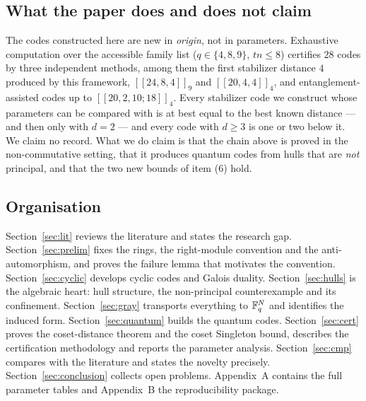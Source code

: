 \subsection{What the paper does and does not claim}

The codes constructed here are new in \emph{origin}, not in parameters.
Exhaustive computation over the accessible family list ($q\in\{4,8,9\}$,
$tn\le8$) certifies $28$ codes by three independent methods, among them the
first stabilizer distance $4$ produced by this framework, $[[24,8,4]]_9$ and
$[[20,4,4]]_4$, and entanglement-assisted codes up to $[[20,2,10;18]]_4$. Every
stabilizer code we construct whose parameters can be compared with
\cite{GrasslCodetables} is at best equal to the best known distance --- and then
only with $d=2$ --- and every code with $d\ge3$ is one or two below it. We claim
no record. What we do claim is that the chain above is proved in the
non-commutative setting, that it produces quantum codes from hulls that are
\emph{not} principal, and that the two new bounds of item (6) hold.

\subsection{Organisation}

Section~\ref{sec:lit} reviews the literature and states the research gap.
Section~\ref{sec:prelim} fixes the rings, the right-module convention and the
anti-automorphism, and proves the failure lemma that motivates the convention.
Section~\ref{sec:cyclic} develops cyclic codes and Galois duality.
Section~\ref{sec:hulls} is the algebraic heart: hull structure, the
non-principal counterexample and its confinement.
Section~\ref{sec:gray} transports everything to $\mathbb F_q^{N}$ and identifies
the induced form. Section~\ref{sec:quantum} builds the quantum codes.
Section~\ref{sec:cert} proves the coset-distance theorem and the coset Singleton
bound, describes the certification methodology and reports the parameter
analysis. Section~\ref{sec:cmp} compares with the literature and states the
novelty precisely. Section~\ref{sec:conclusion} collects open problems. Appendix~A
contains the full parameter tables and Appendix~B the reproducibility package.
